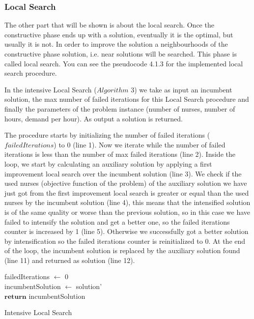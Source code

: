\subsubsection{Local Search}

The other part that will be shown is about the local search. Once the constructive phase ends up with a solution, eventually it is the optimal, but usually it is not. In order to improve the solution a neighbourhoods of the constructive phase solution, i.e. near solutions will be searched. This phase is called local search. You can see the pseudocode 4.1.3 for the implemented local search procedure.

In the intensive Local Search ($Algorithm$ $3$) we take as input an incumbent solution, the max number of failed iterations for this Local Search procedure and finally the parameters of the problem instance (number of nurses, number of hours, demand per hour). As output a solution is returned.

The procedure starts by initializing the number of failed iterations ($failedIterations$) to 0 (line 1). Now we iterate while the number of failed iterations is less than the number of max failed iterations (line 2). Inside the loop, we start by calculating an auxiliary solution by applying a first improvement local search over the incumbent solution (line 3). We check if the used nurses (objective function of the problem) of the auxiliary solution we have just got from the first improvement local search is greater or equal than the  used nurses by the incumbent solution (line 4), this means that the intensified solution is of the same quality or worse than the previous solution, so in this case we have failed to intensify the solution and get a better one, so the failed iterations counter is increased by 1 (line 5). Otherwise we successfully got a better solution by intensification so the failed iterations counter is reinitialized to 0. At the end of the loop, the incumbent solution is replaced by the auxiliary solution found (line 11) and returned as solution (line 12).

\begin{algorithm}[H]


failedIterations $\leftarrow$ 0 \\
incumbentSolution $\leftarrow$ solution'\\
$\textbf{return}$ incumbentSolution
\caption{Intensive Local Search}\label{alg.mainLoop}
\end{algorithm}


